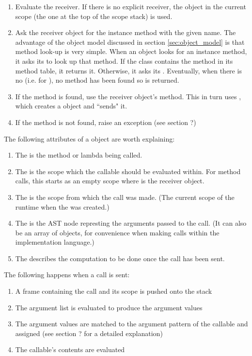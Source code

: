 \begin{enumerate}
  \item Evaluate the receiver. If there is no explicit receiver, the  object in the current scope (the one at the top of the scope stack) is used.
  \item Ask the receiver object for the instance method with the given name. The advantage of the object model discussed in section \ref{sec:object_model} is that method look-up is very simple. When an object looks for an instance method, it asks its  to look up that method. If the class contains the method in its method table, it returns it. Otherwise, it asks its . Eventually, when there is no  (i.e. for ), no method has been found so  is returned.
  \item If the method is found, use the receiver object's  method. This in turn uses , which creates a  object and ``sends" it.
  \item If the method is not found, raise an exception (see section ?)
\end{enumerate}

The following attributes of a  object are worth explaining:

\begin{enumerate}
  \item The  is the method or lambda being called.
  \item The  is the scope which the callable should be evaluated within. For method calls, this starts as an empty scope where  is the receiver object.
  \item The  is the scope from which the call was made. (The current scope of the runtime when the  was created.)
  \item The  is the  AST node represting the arguments passed to the call. (It can also be an array of objects, for convenience when making calls within the implementation language.)
  \item The  describes the computation to be done once the call has been sent.
\end{enumerate}

The following happens when a call is sent:

\begin{enumerate}
  \item A frame containing the call and its scope is pushed onto the stack
  \item The argument list is evaluated to produce the argument values
  \item The argument values are matched to the argument pattern of the callable and assigned (see section ? for a detailed explanation)
  \item The callable's contents are evaluated
\end{enumerate}

